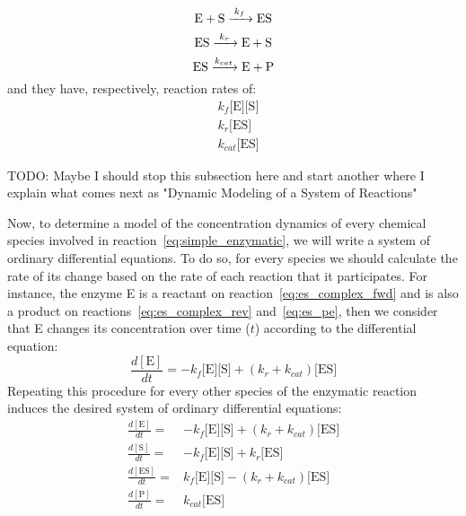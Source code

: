 \begin{equation}
\ce{
    E + S ->[\ce{$k_f$}] ES 
}
\label{eq:es_complex_fwd}
\end{equation}
\begin{equation}
\ce{
    ES ->[$k_r$] E + S
}
\label{eq:es_complex_rev}
\end{equation}
\begin{equation}
\ce{
    ES ->[$k_{cat}$] E + P
}
\label{eq:es_pe}
\end{equation}
and they have, respectively, reaction rates of:
\begin{equation*}
\begin{aligned}
    & k_f\text{[E][S]} \\
    & k_r\text{[ES]} \\
    & k_{cat}\text{[ES]}
\end{aligned}
\end{equation*}

{\color{blue} TODO: Maybe I should stop this subsection here and start another
where I explain what comes next as "Dynamic Modeling of a System of Reactions"}

Now, to determine a model of the concentration dynamics of every 
chemical species involved in reaction~\ref{eq:simple_enzymatic}, we will
write a system of ordinary differential equations. To do so, for every 
species we should calculate the rate of its change based on the rate of 
each reaction that it participates. For instance, the enzyme E is a 
reactant on reaction~\ref{eq:es_complex_fwd} and is also a product on 
reactions~\ref{eq:es_complex_rev} and~\ref{eq:es_pe}, then we consider 
that E changes its concentration over time ($t$) according to the 
differential equation:
\begin{equation}
    \frac{d[\text{E}]}{dt} = -k_f\text{[E][S]} + (k_r + k_{cat}) \text{[ES]}
\end{equation} 
Repeating this procedure for every other species of the enzymatic 
reaction induces the desired system of ordinary differential equations:
\begin{equation}
    \begin{aligned}
        \frac{d[\text{E}]}{dt} = & -k_f\text{[E][S]} + (k_r + k_{cat}) \text{[ES]} \\
        \frac{d[\text{S}]}{dt} = & -k_f\text{[E][S]} + k_r\text{[ES]} \\
        \frac{d[\text{ES}]}{dt} = & k_f\text{[E][S]} - (k_r + k_{cat}) \text{[ES]} \\
        \frac{d[\text{P}]}{dt} = &  k_{cat}\text{[ES]} \\
    \end{aligned}
\end{equation}

